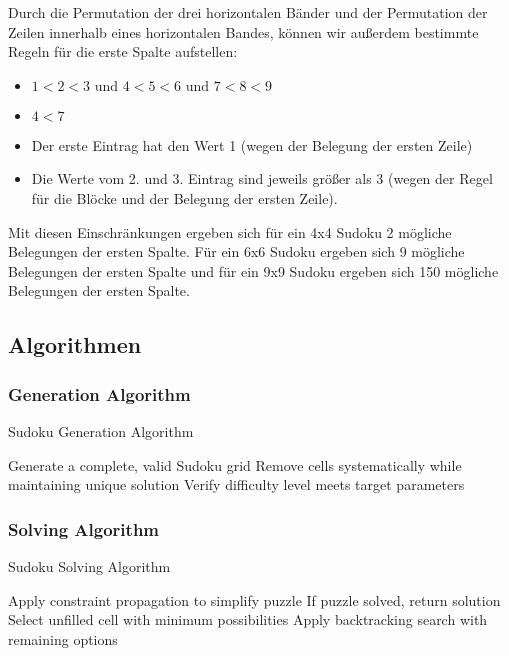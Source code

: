 \documentclass[12pt,a4paper]{article}
\begin{document}
Durch die Permutation der drei horizontalen Bänder und der Permutation der Zeilen innerhalb eines horizontalen Bandes, können wir außerdem bestimmte Regeln für die erste Spalte aufstellen:
\begin{itemize}
    \item $1< 2< 3 \text{ und } 4<5<6 \text{ und } 7<8<9$
    \item $4 < 7$
    \item Der erste Eintrag hat den Wert 1 (wegen der Belegung der ersten Zeile)
    \item Die Werte vom 2. und 3. Eintrag sind jeweils größer als 3 (wegen der Regel für die Blöcke und der Belegung der ersten Zeile).
\end{itemize}
Mit diesen Einschränkungen ergeben sich für ein 4x4 Sudoku 2 mögliche Belegungen der ersten Spalte. Für ein 6x6 Sudoku ergeben sich 9 mögliche
Belegungen der ersten Spalte und für ein 9x9 Sudoku ergeben sich 150 mögliche Belegungen der ersten Spalte. \\

\subsection{Algorithmen}
\subsubsection{Generation Algorithm}
\begin{algorithm}
\caption{Sudoku Generation Algorithm}
\begin{algorithmic}[1]
\State Generate a complete, valid Sudoku grid
\State Remove cells systematically while maintaining unique solution
\State Verify difficulty level meets target parameters
\end{algorithmic}
\end{algorithm}

\subsubsection{Solving Algorithm}
\begin{algorithm}
\caption{Sudoku Solving Algorithm}
\begin{algorithmic}[1]
\State Apply constraint propagation to simplify puzzle
\State If puzzle solved, return solution
\State Select unfilled cell with minimum possibilities
\State Apply backtracking search with remaining options
\end{algorithmic}
\end{algorithm}
\end{document}
